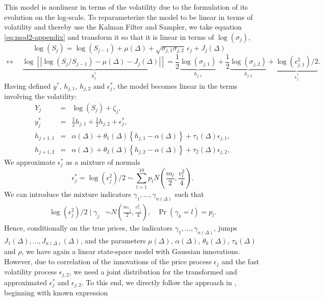 This model is nonlinear in terms of the volatility due to the formulation of its evolution on the log-scale. To reparameterize the model to be linear in terms of volatility and thereby use the Kalman Filter and Sampler, we take equation \eqref{eq:mod2-appendix} and transform it so that it is linear in terms of $\log(\sigma_j)$,
\[
  \log(S_{j}) = \log(S_{j-1}) + \mu(\Delta) + \sqrt{\sigma_{j,1}\sigma_{j,2}} \, \epsilon_{j} + J_j(\Delta) \quad \]
\[ \leftrightarrow \quad \underbrace{ \log\left[ \left| \log(S_{j}/S_{j-1}) - \mu(\Delta) - J_j(\Delta) \right| \right] }_{y_j^*} = \frac{1}{2}\underbrace{  \log(\sigma_{j,1}) }_{h_{j,1}} + \frac{1}{2}\underbrace{  \log(\sigma_{j,2}) }_{h_{j,2}} + \underbrace{ \log(  \epsilon_{j,1}^2  )/2 }_{\epsilon_{j}^{*}}.
\]
Having defined $y^*$, $h_{j,1}$, $h_{j,2}$ and $\epsilon_{j}^*$, the model becomes linear in the terms involving the volatility:
\begin{eqnarray}
	Y_j &=& \log(S_j) + \zeta_j  ,    \\
	y_j^* &=& \frac{1}{2}h_{j,1} + \frac{1}{2}h_{j,2} + \epsilon^*_{j}, \label{eq:yjstar} \\
  h_{j+1,1} &=& \alpha(\Delta) + \theta_1(\Delta) \left\{ h_{j,1}- \alpha(\Delta) \right\} + \tau_1(\Delta) \epsilon_{j,1}  \label{eq:hj1}, \\
  h_{j+1,2} &=& \alpha(\Delta) + \theta_2(\Delta) \left\{ h_{j,2}- \alpha(\Delta) \right\} + \tau_2(\Delta) \epsilon_{j,2}  \label{eq:hj2},
\end{eqnarray}
We approximate $\epsilon^*_{j}$ as a mixture of normals
\[
	\epsilon^*_{j} = \log( \epsilon_{j}^2 )/2 \sim \sum_{l=1}^{10} p_l N \left( \frac{m_l}{2}, \frac{v_l^2}{4} \right).
\]
We can introduce the mixture indicators $\gamma_1, \ldots, \gamma_{n(\Delta)}$ such that
\begin{align*}
\log( \epsilon^2_{j} )/2 \mid \gamma_j &\sim N \left( \frac{m_{\gamma_j}}{2}, \frac{v_{\gamma_j}^2}{4} \right)   ,   &   \Pr(\gamma_k = l) = p_l .
\end{align*}
Hence, conditionally on the true prices, the indicators $\gamma_{1}, \ldots, \gamma_{n(\Delta)}$, jumps $J_{1}(\Delta), \ldots, J_{n(\Delta)}(\Delta)$, and the parameters $\mu(\Delta)$, $\alpha(\Delta)$, $\theta_k(\Delta)$, $\tau_k(\Delta)$ and $\rho$, we have again a linear state-space model with Gaussian innovations. However, due to correlation of  the innovations of the price process $\epsilon_{j}$ and the fast volatility process $\epsilon_{j,2}$, we need a joint distribution for the transformed and approximated $\epsilon_{j}^*$ and $\epsilon_{j,2}$. To this end, we directly follow the approach in \cite{omori2007stochastic}, beginning with known expression
